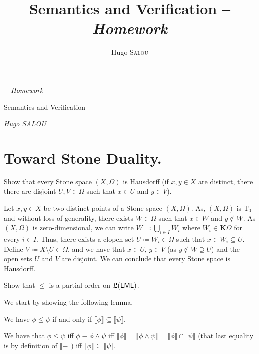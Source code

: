 \documentclass[fontsize=16pt,a4paper,DIV=17,parskip=half]{scrartcl}
\title{Semantics and Verification -- \textit{Homework}}
\author{Hugo \textsc{Salou}}
\renewcommand{\mathsf}[1]{\textup{\textsf{#1}}}
\renewcommand{\labelitemi}{\bfseries\color{deepblue}$\triangleright$}
\renewcommand{\labelitemii}{\bfseries\color{deepblue}–}
\renewcommand{\labelitemiii}{\bfseries\color{deepblue}•}
\theoremstyle{definition}
\newcommand\defineMarkerColor[2]{
  \AtBeginEnvironment{#1}{
    \setlist[enumerate]{font={\color{#2}}}
    \renewcommand{\labelitemi}{\color{#2}\small$\triangleright$}
    \renewcommand{\labelitemii}{\color{#2}–}
    \renewcommand{\labelitemiii}{\color{#2}•}
    \renewcommand\emph[1]{{\bfseries\em\color{#2}##1}}
  }
}
\renewcommand{\labelitemi}{\bfseries\color{deepblue}\small$\triangleright$}
\renewcommand{\labelitemii}{\bfseries\color{deepblue}–}
\renewcommand{\labelitemiii}{\bfseries\color{deepblue}•}
\renewcommand{\labelitemi}{\color{deepblue}\small$\triangleright$}
\renewcommand{\labelitemii}{\color{deepblue}–}
\renewcommand{\labelitemiii}{\color{deepblue}•}
\newenvironment{prv}[1][\proofname]{\vspace{-12pt}%
\begin{replacementproof}}{\end{replacementproof}} \defineMarkerColor{prv}{deepred}
\let\emph\relax
\begin{document}
  \begin{center}
    \bfseries
    \sffamily

    {\large\itshape ---\hspace{1em}Homework\hspace{1em}---}

    {\huge Semantics and Verification}

    {\large \itshape Hugo SALOU}
  \end{center}

  \section{Toward Stone Duality.}

  \begin{que}
    Show that every Stone space $(X, \Omega)$ is Hausdorff (if $x, y \in X$ are distinct, there there are disjoint $U, V \in \Omega$ such that $x \in U$ and $y \in V$).
  \end{que}

  Let $x, y \in X$ be two distinct points of a Stone space $(X, \Omega)$.
  As, $(X, \Omega)$ is $\mathrm{T_0}$ and without loss of generality, there exists $W \in \Omega$ such that $x \in W$ and $y \not\in W$.
  As $(X, \Omega)$ is zero-dimensional, we can write $W \eqqcolon \bigcup_{i \in  I} W_i$ where $W_i \in \mathbf{K}\Omega$ for every $i \in I$.
  Thus, there exists a clopen set $U \coloneqq W_i \in \Omega$ such that ${x \in W_i \subseteq U}$.
  Define $V \coloneqq X \setminus U \in \Omega$, and we have that $x \in U$, $y \in V$ (as $y \not\in W \supseteq U$) and the open sets $U$ and $V$ are disjoint.
  We can conclude that every Stone space is Hausdorff.

  \begin{que}
    \label{q2}
    Show that $\le$ is a partial order on $\mathfrak L(\mathsf{LML})$.
  \end{que}

  We start by showing the following lemma.
  \begin{lem}
    \label{lem1}
    We have $\phi \le \psi$ if and only if $\llbracket \phi\rrbracket \subseteq \llbracket \psi\rrbracket$.
  \end{lem}
  \begin{prv}
    We have that $\phi \le \psi$ iff $\phi \equiv \phi \land \psi$ iff $\llbracket \phi\rrbracket = \llbracket \phi \land \psi\rrbracket = \llbracket \phi\rrbracket \cap \llbracket \psi\rrbracket$ (that last equality is by definition of $\llbracket -\rrbracket$) iff $\llbracket \phi\rrbracket \subseteq \llbracket \psi\rrbracket$.
  \end{prv}
\end{document}
